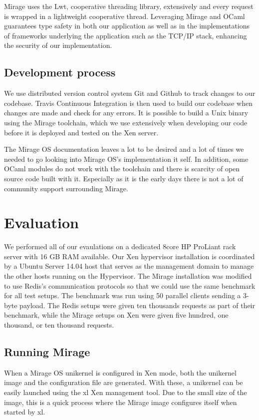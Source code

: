 \documentclass[english,10pt,twocolumn]{article}
\begin{document}
Mirage uses the Lwt, cooperative threading library, extensively and every request is wrapped in a lightweight cooperative thread. Leveraging Mirage and OCaml guarantees type safety in both our application as well as in the implementations of frameworks underlying the application such as the TCP/IP stack, enhancing the security of our implementation.


\subsection{Development process}

We use distributed version control system Git and Github to track changes to our codebase.
Travis Continuous Integration is then used to build our codebase when changes are made and check for any errors.
It is possible to build a Unix binary using the Mirage toolchain, which we use extensively when developing our code before it is deployed and tested on the Xen server.

The Mirage OS documentation leaves a lot to be desired and a lot of times we needed to go looking into Mirage OS's implementation it self.
In addition, some OCaml modules do not work with the toolchain and there is scarcity of open source code built with it.
Especially as it is the early days there is not a lot of community support surrounding Mirage.


\section{Evaluation}

We performed all of our evaulations on a dedicated 8\-core HP ProLiant rack server with 16 GB RAM available.
Our Xen hypervisor installation is coordinated by a Ubuntu Server 14.04 host that serves as the management domain to manage the other hosts running on the Hypervisor.
The Mirage installation was modified to use Redis's communication protocols so that we could use the same benchmark for all test setups. The benchmark was run using 50 parallel clients sending a 3-byte payload.
The Redis setups were given ten thousands requests as part of their benchmark, while the Mirage setups on Xen were given five hundred, one thousand, or ten thousand requests.


\subsection{Running Mirage}

When a Mirage OS unikernel is configured in Xen mode, both the unikernel image and the configuration file are generated.
With these, a unikernel can be easily launched using the xl Xen management tool.
Due to the small size of the image, this is a quick process where the Mirage image configures itself when started by xl.
\end{document}
